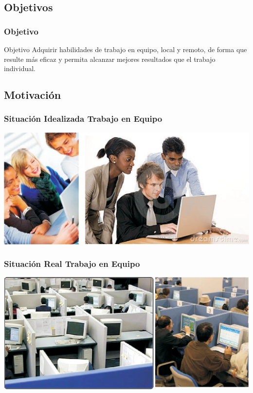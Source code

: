 \documentclass[a4paper,slidestop,xcolor=pst,dvips,blue]{beamer}
\begin{document}
\subsection{Objetivos}

\begin{frame}[c]
	\frametitle{Objetivo}
	\begin{block}{Objetivo}
		Adquirir habilidades de trabajo en equipo, local y remoto, de forma que resulte más eficaz y permita alcanzar mejores resultados que el trabajo individual.
	\end{block}
\end{frame}

\subsection{Motivación}

\begin{frame}[c]
	\frametitle{Situación Idealizada Trabajo en Equipo}
	\begin{center}
		\includegraphics[width=\linewidth,keepaspectratio=true]{images/motivacion.eps}
	\end{center}
\end{frame}

\begin{frame}[c]
	\frametitle{Situación Real Trabajo en Equipo}
	\begin{center}
		\includegraphics[width=\linewidth,keepaspectratio=true]{images/realidad.eps}
	\end{center}
\end{frame}
\end{document}
